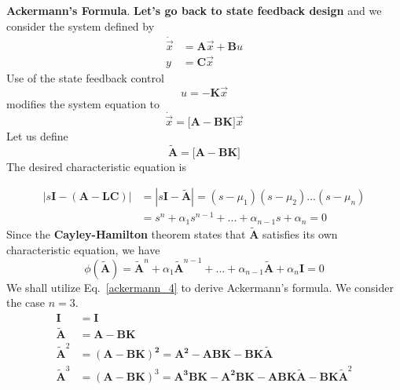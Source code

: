 \documentclass[12pt,a4paper,oneside]{book}
\begin{document}
\begin{onehalfspace}
\vspace{5mm}
\textbf{Ackermann's Formula}.
\textbf{Let's go back to state feedback design} and we consider the system defined by
\begin{equation} \label{ackermann_1}
	\begin{split}
		\dot{\vec x} & = \mathbf{A}\vec x + \mathbf{B}u \\
		y & = \mathbf{C}\vec x
	\end{split}
\end{equation}
Use of the state feedback control 
\begin{equation*}
	u = -\mathbf{K}\vec x
\end{equation*}
modifies the system equation to 
\begin{equation} \label{ackermann_2}
	\dot{\vec x} = \mathbf{\Big[A-BK\Big]}\vec x
\end{equation}
Let us define
\begin{equation*}
	\tilde{\mathbf{A}} = \mathbf{\Big[A-BK\Big]}
\end{equation*}
The desired characteristic equation is

\begin{equation} \label{ackermann_3}
	\begin{split}
		|s\mathbf{I-(A - LC)}| & = |s\mathbf{I}-\tilde{\mathbf{A}}| = (s-\mu_1)(s-\mu_2)...(s-\mu_n) \\
		& = s^n +\alpha_1s^{n-1}+...+\alpha_{n-1}s+\alpha_n = 0
	\end{split}
\end{equation}
Since the \textbf{Cayley-Hamilton} theorem states that $\tilde{\mathbf{A}}$ satisfies its own characteristic equation, we have
\begin{equation} \label{ackermann_4}
	\phi(\tilde{\mathbf{A}}) = \tilde{\mathbf{A}}^n+\alpha_1\tilde{\mathbf{A}}^{n-1}+...+\alpha_{n-1}\tilde{\mathbf{A}}+\alpha_n\mathbf{I} = 0
\end{equation}
We shall utilize Eq.~\eqref{ackermann_4} to derive Ackermann's formula. We 
consider the case $n=3$.
\begin{equation*}
	\begin{split}
		\mathbf{I} & = \mathbf{I} \\
		\tilde{\mathbf{A}} & = \mathbf{A-BK} \\
		\tilde{\mathbf{A}}^2 & = \mathbf{(A-BK)^2=A^2-ABK-BK}\tilde{\mathbf{A}} \\
		\tilde{\mathbf{A}}^3 & = \mathbf{(A-BK)}^3=\mathbf{A^3BK-A^2BK-ABK}\tilde{\mathbf{A}}-\mathbf{BK}\tilde{\mathbf{A}}^2
	\end{split}
\end{equation*}


\end{onehalfspace}
\end{document}
